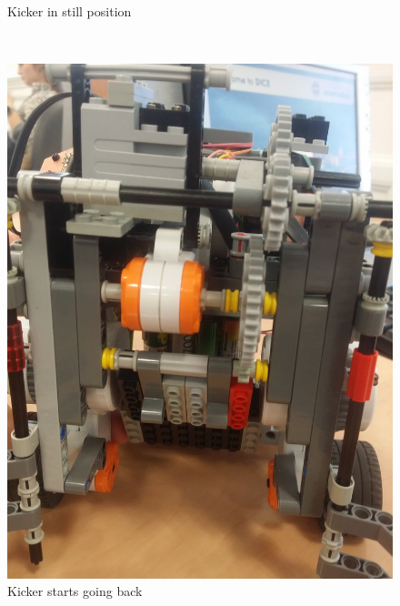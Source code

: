 \documentclass[a4paper,12pt]{article}
\begin{document}
\begin{figure}[ht]
\begin{minipage}[b]{.3\textwidth}
		\caption{Kicker in still position}
		\label{fig:kicker}
	\end{minipage}
	~
	\begin{minipage}[b]{.3\textwidth}
        \centering
		\includegraphics[scale=0.04, angle=-90]{kick_middle.jpg}
		\caption{Kicker starts going back}
		

\end{minipage}
\end{figure}
\end{document}
